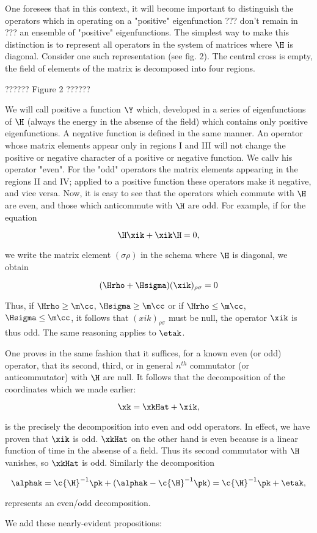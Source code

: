 \documentclass{article}
\newcommand{\uequ}[1]{
\begin{equation*}
#1
\end{equation*}
}
\newcommand{\opinv}[1]{{#1}^{-1}}
\begin{document}
One foresees that in this context, it will become important to distinguish the operators which in operating on a "positive" eigenfunction ??? don't remain in ??? an ensemble of "positive" eigenfunctions. The simplest way to make this distinction is to represent all operators in the system of matrices where $\H$ is diagonal. Consider one such representation (see fig. 2). The central cross is empty, the field of elements of the matrix is decomposed into four regions.

?????? Figure 2 ??????

We will call positive a function $\Y$ which, developed in a series of eigenfunctions of $\H$ (always the energy in the absense of the field) which contains only positive eigenfunctions. A negative function is defined in the same manner. An operator whose matrix elements appear only in regions I and III will not change the positive or negative character of a positive or negative function. We callv his operator "even". For the "odd" operators the matrix elements appearing in the regions II and IV; applied to a positive function these operators make it negative, and vice versa. Now, it is easy to see that the operators which commute with $\H$ are even, and those which anticommute with $\H$ are odd. For example, if for the equation
\uequ{
\H\xik + \xik\H = 0,
}
we write the matrix element $(\sigma\rho)$ in the schema where $\H$ is diagonal, we obtain
\uequ{
(\Hrho + \Hsigma)(\xik)_{\rho\sigma} = 0
}

Thus, if $\Hrho \geq \m\cc$, $\Hsigma \geq \m\cc$ or if $\Hrho \leq \m\cc$, $\Hsigma \leq \m\cc$, it follows that $(xik)_{\rho\sigma}$ must be null, the operator $\xik$ is thus odd. The same reasoning applies to $\etak$.

One proves in the same fashion that it suffices, for a known even (or odd) operator, that its second, third, or in general $n^{th}$ commutator (or anticommutator) with $\H$ are null. It follows that the decomposition of the coordinates which we made earlier:
\uequ{
\xk = \xkHat + \xik,
}
is the precisely the decomposition into even and odd operators. In effect, we have proven that $\xik$ is odd. $\xkHat$ on the other hand is even because is a linear function of time in the absense of a field. Thus its second commutator with $\H$ vanishes, so $\xkHat$ is odd. Similarly the decomposition
\uequ{
\alphak = \c\opinv{\H}\pk + (\alphak - \c\opinv{\H}\pk) = \c\opinv{\H}\pk + \etak,
}
represents an even/odd decomposition.

We add these nearly-evident propositions:
\end{document}

